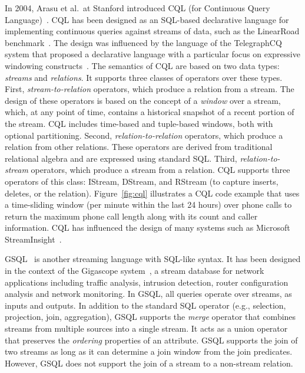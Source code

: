 In 2004, Arasu et al.\ at Stanford introduced CQL (for Continuous
Query Language)~\cite{arasu_widom_2004}. CQL has been designed as an
SQL-based declarative language for implementing continuous queries
against streams of data, such as the LinearRoad
benchmark~\cite{arasu_et_al_2004}. The design was influenced by the language of
the TelegraphCQ system that proposed a declarative language with a
particular focus on expressive windowing
constructs~\cite{chandrasekaran_et_al_2003}. The semantics of CQL are
based on two data types: \emph{streams} and \emph{relations}. It
supports three classes of operators over these types. First,
\emph{stream-to-relation} operators, which produce a relation from a
stream.  The design of these operators is based on the concept of a
\emph{window} over a stream, which, at any point of time, contains a
historical snapshot of a recent portion of the stream. CQL includes
time-based and tuple-based windows, both with optional
partitioning. Second, \emph{relation-to-relation} operators, which
produce a relation from other relations. These operators are derived
from traditional relational algebra and are expressed using standard
SQL. Third, \emph{relation-to-stream} operators, which produce a
stream from a relation. CQL supports three operators of this class:
IStream, DStream, and RStream (to capture inserts, deletes, or the
relation).  Figure~\ref{fig:cql} illustrates a CQL code example that
uses a time-sliding window (per minute within the last 24 hours) over
phone calls to return the maximum phone call length along with its
count and caller information. CQL has influenced the design of many
systems such as Microsoft StreamInsight~\cite{ali_et_al_2009}.

GSQL~\cite{cranor_et_al_2003} is another streaming  language with SQL-like syntax.
It has been designed in the context of the Gigascope system~\cite{cranor2003gigascope}, a stream database for network applications
including traffic analysis, intrusion detection, router configuration analysis and network monitoring.
In GSQL, all queries operate over streams, as inputs and outputs. 
In addition to the standard SQL operator (e.g., selection, projection, join, aggregation), GSQL supports  the \emph{merge} operator that combines streams from multiple sources into a single stream. It acts as a union operator that preserves the \emph{ordering} properties of an attribute.
GSQL supports the join of two streams as long as it can determine
a join window from the join predicates. However, GSQL does
not support the join of a stream to a non-stream relation.
